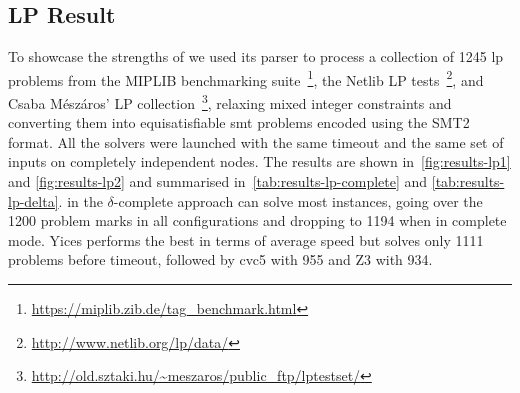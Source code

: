 \documentclass[runningheads]{llncs}
\begin{document}
\subsection*{LP Result}

To showcase the strengths of \dlinear we used its parser to process a collection of 1245 \gls{lp} problems from the MIPLIB benchmarking suite~\footnote{\url{https://miplib.zib.de/tag_benchmark.html}}, the Netlib LP tests~\footnote{\url{http://www.netlib.org/lp/data/}}, and Csaba Mészáros' LP collection~\footnote{\url{http://old.sztaki.hu/~meszaros/public_ftp/lptestset/}}, relaxing mixed integer constraints and converting them into equisatisfiable \gls{smt} problems encoded using the SMT2 format.
All the solvers were launched with the same timeout and the same set of inputs on completely independent nodes.
The results are shown in~\autoref{fig:results-lp1} and \autoref{fig:results-lp2} and summarised in~\autoref{tab:results-lp-complete} and \autoref{tab:results-lp-delta}.
\dlinear in the $\delta$-complete approach can solve most instances, going over the 1200 problem marks in all configurations and dropping to 1194 when in complete mode.
Yices performs the best in terms of average speed but solves only 1111 problems before timeout, followed by cvc5 with 955 and Z3 with 934.
\end{document}
